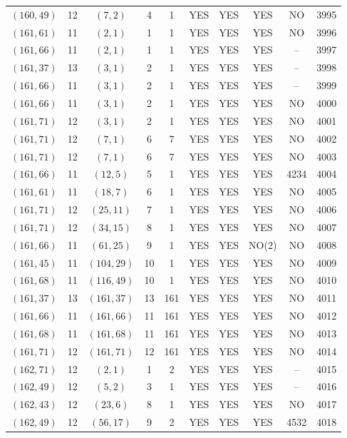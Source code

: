 \begin{longtable}{|c|c|c|c|c|c|c|c|c|c|}
$(160, 49)$ & 12 & $(7, 2)$ & 4 & 1 & YES & YES & YES & NO & 3995\\
$(161, 61)$ & 11 & $(2, 1)$ & 1 & 1 & YES & YES & YES & NO & 3996\\
$(161, 66)$ & 11 & $(2, 1)$ & 1 & 1 & YES & YES & YES & -- & 3997\\
$(161, 37)$ & 13 & $(3, 1)$ & 2 & 1 & YES & YES & YES & -- & 3998\\
$(161, 66)$ & 11 & $(3, 1)$ & 2 & 1 & YES & YES & YES & -- & 3999\\
$(161, 66)$ & 11 & $(3, 1)$ & 2 & 1 & YES & YES & YES & NO & 4000\\
$(161, 71)$ & 12 & $(3, 1)$ & 2 & 1 & YES & YES & YES & NO & 4001\\
$(161, 71)$ & 12 & $(7, 1)$ & 6 & 7 & YES & YES & YES & NO & 4002\\
$(161, 71)$ & 12 & $(7, 1)$ & 6 & 7 & YES & YES & YES & NO & 4003\\
$(161, 66)$ & 11 & $(12, 5)$ & 5 & 1 & YES & YES & YES & 4234 & 4004\\
$(161, 61)$ & 11 & $(18, 7)$ & 6 & 1 & YES & YES & YES & NO & 4005\\
$(161, 71)$ & 12 & $(25, 11)$ & 7 & 1 & YES & YES & YES & NO & 4006\\
$(161, 71)$ & 12 & $(34, 15)$ & 8 & 1 & YES & YES & YES & NO & 4007\\
$(161, 66)$ & 11 & $(61, 25)$ & 9 & 1 & YES & YES & NO(2) & NO & 4008\\
$(161, 45)$ & 11 & $(104, 29)$ & 10 & 1 & YES & YES & YES & NO & 4009\\
$(161, 68)$ & 11 & $(116, 49)$ & 10 & 1 & YES & YES & YES & NO & 4010\\
$(161, 37)$ & 13 & $(161, 37)$ & 13 & 161 & YES & YES & YES & NO & 4011\\
$(161, 66)$ & 11 & $(161, 66)$ & 11 & 161 & YES & YES & YES & NO & 4012\\
$(161, 68)$ & 11 & $(161, 68)$ & 11 & 161 & YES & YES & YES & NO & 4013\\
$(161, 71)$ & 12 & $(161, 71)$ & 12 & 161 & YES & YES & YES & NO & 4014\\
$(162, 71)$ & 12 & $(2, 1)$ & 1 & 2 & YES & YES & YES & -- & 4015\\
$(162, 49)$ & 12 & $(5, 2)$ & 3 & 1 & YES & YES & YES & -- & 4016\\
$(162, 43)$ & 12 & $(23, 6)$ & 8 & 1 & YES & YES & YES & NO & 4017\\
$(162, 49)$ & 12 & $(56, 17)$ & 9 & 2 & YES & YES & YES & 4532 & 4018\\

\end{longtable}
